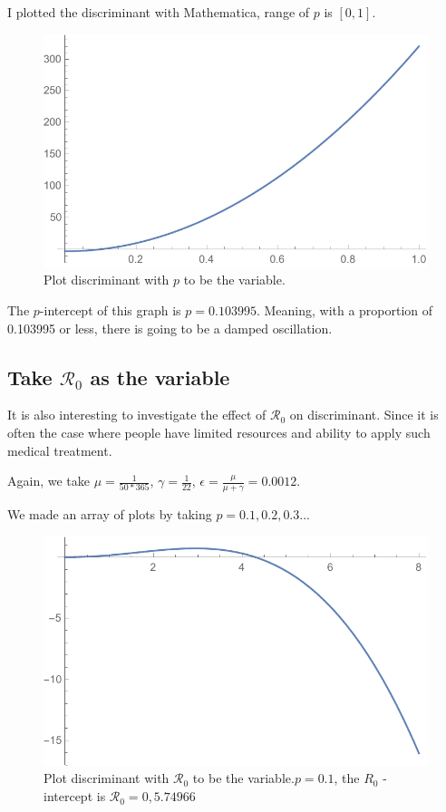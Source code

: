 \documentclass[12pt]{article}
\newcommand{\R}{\mathcal{R}}
\begin{document}
I plotted the discriminant with Mathematica, range of $p$ is $[0,1]$.

\begin{figure}[H]
  \caption{Plot discriminant with $p$ to be the variable.}
  \centering
  \includegraphics[width=1.1\textwidth]{Figures/Discriminant_plot_newborn.pdf}
\end{figure}

The $p$-intercept of this graph is $p=0.103995$. Meaning, with a proportion of 0.103995 or less, there is going to be a damped oscillation.

\subsection{Take $\R_0$ as the variable}
It is also interesting to investigate the effect of $\R_0$ on discriminant. Since it is often the case where people have limited resources and ability to apply such medical treatment.

Again, we take $\mu=\frac{1}{50*365}$, $\gamma=\frac{1}{22}$, $\epsilon=\frac{\mu}{\mu+\gamma}=0.0012$.

We made an array of plots by taking $p=0.1,0.2,0.3...$

\begin{figure}[H]
  \caption{Plot discriminant with $\R_0$ to be the variable.$p=0.1$, the $R_0$ -intercept is $\R_0 = 0, 5.74966$}
  \centering
  \includegraphics[width=1.1\textwidth]{Figures/Plot_R_0_p_0_1.pdf}
\end{figure}
\end{document}
